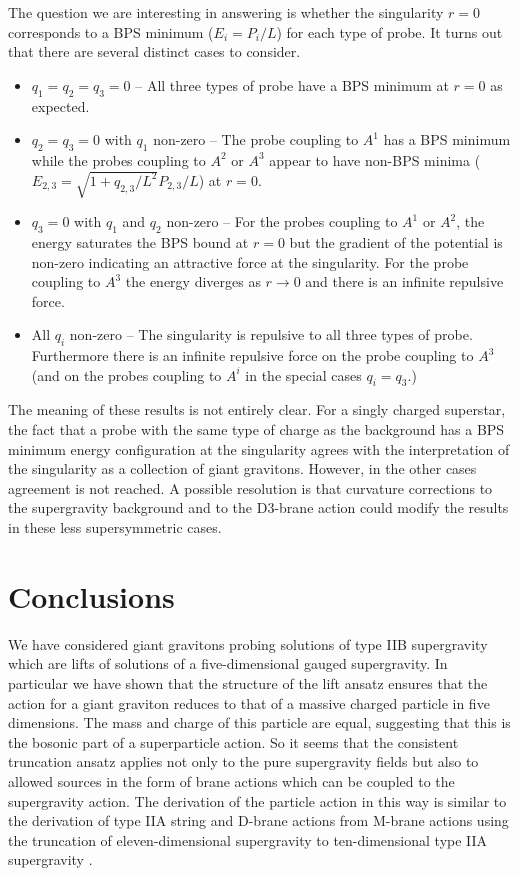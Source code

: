 \documentclass[a4paper,12pt]{article}
\begin{document}
The question we are interesting in answering is whether the singularity $r=0$
corresponds to a BPS minimum ($E_i = P_i/L$) for each type of probe. It turns
out that there are several distinct cases to consider.
\begin{itemize}
\item
$q_1=q_2=q_3=0$ -- All three types of probe have a BPS minimum at $r=0$ as
expected.

\item
$q_2=q_3=0$ with $q_1$ non-zero -- The probe coupling to $A^1$ has a BPS
minimum while the probes coupling to $A^2$ or $A^3$ appear to have non-BPS
minima ($E_{2,3} = \sqrt{1+q_{2,3}/L^2}P_{2,3}/L$) at $r=0$.

\item
$q_3=0$ with $q_1$ and $q_2$ non-zero -- For the probes coupling to $A^1$ or
$A^2$, the energy saturates the BPS bound at $r=0$ but the gradient of the
potential is non-zero indicating an attractive force at the singularity. For
the probe coupling to $A^3$ the energy diverges as $r \rightarrow 0$ and there
is an infinite repulsive force. 

\item
All $q_i$ non-zero -- The singularity is repulsive to all three types of
probe. Furthermore there is an infinite repulsive force on the probe
coupling to $A^3$ (and on the probes coupling to $A^i$ in the special cases
$q_i = q_3$.)
\end{itemize}

The meaning of these results is not entirely clear. For a singly charged superstar, the fact that a probe with the same type of charge as the background has a BPS minimum energy configuration at the singularity agrees with the interpretation of the singularity as a collection of giant gravitons. However, in the other cases agreement is not reached. A possible resolution is that curvature corrections to the supergravity background and to the D3-brane action could modify the results in these less supersymmetric cases.
 
\section{Conclusions}

We have considered giant gravitons probing solutions of type IIB supergravity which are lifts of solutions of a five-dimensional gauged supergravity.  In
particular we have shown that the structure of the lift ansatz ensures that the
action for a giant graviton reduces to that of a massive charged particle in
five dimensions. The mass and charge of this particle are equal, suggesting that this is the
bosonic part of a superparticle action. So it seems that the consistent
truncation ansatz applies not only to the pure supergravity fields but also to
allowed sources in the form of brane actions which can be coupled to the
supergravity action. The derivation of the particle action in this way is
similar to the derivation of type IIA string and D-brane actions from M-brane
actions using the truncation of eleven-dimensional supergravity to
ten-dimensional type IIA supergravity \cite{Duff:1987bx, Townsend:1996af}.
\end{document}
